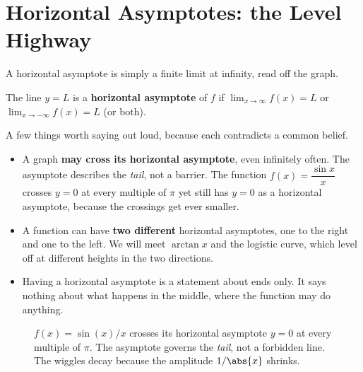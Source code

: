 \section{Horizontal Asymptotes: the Level Highway}
\label{ch09:horizontal}

A horizontal asymptote is simply a finite limit at infinity, read off the graph.

\begin{definition}
\label{ch09:def-ha}
The line $y=L$ is a \textbf{horizontal asymptote} of $f$ if
$\lim_{x\to\infty} f(x) = L$ or $\lim_{x\to-\infty} f(x) = L$ (or both).
\end{definition}

A few things worth saying out loud, because each contradicts a common belief.

\begin{itemize}
\item A graph \textbf{may cross its horizontal asymptote}, even infinitely
often. The asymptote describes the \emph{tail}, not a barrier. The function
$f(x) = \dfrac{\sin x}{x}$ crosses $y=0$ at every multiple of $\pi$ yet still
has $y=0$ as a horizontal asymptote, because the crossings get ever smaller.
\item A function can have \textbf{two different} horizontal asymptotes, one to
the right and one to the left. We will meet $\arctan x$ and the logistic curve,
which level off at different heights in the two directions.
\item Having a horizontal asymptote is a statement about ends only. It says
nothing about what happens in the middle, where the function may do anything.
\end{itemize}

\begin{figure}[H]
\centering
{}
\caption{$f(x)=\sin(x)/x$ crosses its horizontal asymptote $y=0$ at every
multiple of $\pi$. The asymptote governs the \emph{tail}, not a forbidden line.
The wiggles decay because the amplitude $1/\abs{x}$ shrinks.}
\label{ch09:fig-sinc}
\end{figure}

